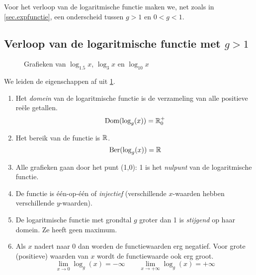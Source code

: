 Voor het verloop van de logaritmische functie maken
we, net zoals in \cref{sec.expfunctie}, een onderscheid
tussen $g>1$ en $0<g<1$.

\subsection[Verloop van de logaritmische functie met $g>1$]
{Verloop van de logaritmische functie met
\boldmath$g>1$\unboldmath} \label{sec:logfuncgroter1}

\begin{figure}[htbp]
    \centering
    \caption{Grafieken van $\log_{1.5}x$, $\log_3x$ en $\log_{10}x$}
    \label{fig:loggroter1}
\end{figure}
We leiden de eigenschappen af uit \cref{fig:loggroter1}.
\begin{enumerate}
     \item  Het \emph{domein} van de logaritmische functie is de verzameling van alle
    positieve re\"{e}le getallen. 
    \[
      \text{Dom}(\log_g(x))=\mathbb{R}^{+}_{0}
    \]

    \item  Het bereik van de functie is $\mathbb{R}$. 
    \[
      \text{Ber}(\log_g(x))=\mathbb{R}
    \]
   \item  Alle grafieken gaan door het punt (1,0): 1 is het \emph{nulpunt}
    van de logaritmische functie.

    \item  De functie is  één-op-één of \emph{injectief} (verschillende $x$-waarden hebben verschillende $y$-waarden).
    \item  De logaritmische functie met grondtal $g$ groter dan 1 is \emph{stijgend} op haar domein. Ze heeft geen maximum.


    \item  Als $x$ nadert naar 0 dan worden de functiewaarden erg negatief. Voor grote (positieve) waarden van $x$ wordt de functiewaarde ook erg groot.
    \[
    \lim_{x\rightarrow0}\log_g(x)=-\infty \qquad \lim_{x\rightarrow+\infty}\log_g(x)=+\infty
    \]
\end{enumerate}

